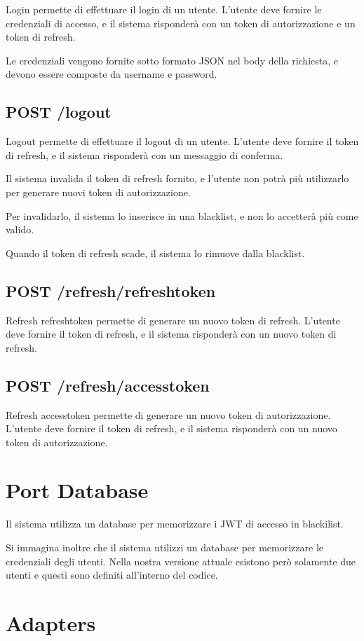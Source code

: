 Login permette di effettuare il login di un utente. L'utente deve fornire le credenziali di accesso, e il sistema risponderà con un token di autorizzazione e un token di refresh.

Le credenziali vengono fornite sotto formato JSON nel body della richiesta, e devono essere composte da username e password.

\subsection{POST /logout}

Logout permette di effettuare il logout di un utente. L'utente deve fornire il token di refresh, e il sistema risponderà con un messaggio di conferma.

Il sistema invalida il token di refresh fornito, e l'utente non potrà più utilizzarlo per generare nuovi token di autorizzazione.

Per invalidarlo, il sistema lo inserisce in una blacklist, e non lo accetterà più come valido.

Quando il token di refresh scade, il sistema lo rimuove dalla blacklist.

\subsection{POST /refresh/refreshtoken}

Refresh refreshtoken permette di generare un nuovo token di refresh. L'utente deve fornire il token di refresh, e il sistema risponderà con un nuovo token di refresh.

\subsection{POST /refresh/accesstoken}

Refresh accesstoken permette di generare un nuovo token di autorizzazione. L'utente deve fornire il token di refresh, e il sistema risponderà con un nuovo token di autorizzazione.

\section{Port Database}

Il sistema utilizza un database per memorizzare i JWT di accesso in blackilist.

Si immagina inoltre che il sistema utilizzi un database per memorizzare le credenziali degli utenti. Nella nostra versione attuale esistono però solamente due utenti e questi sono definiti all'interno del codice.





\section{Adapters}